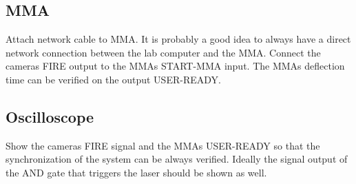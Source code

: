 \documentclass{scrartcl}
\begin{document}
\subsection{MMA}
Attach network cable to MMA. It is probably a good idea to always have
a direct network connection between the lab computer and the MMA.
Connect the cameras FIRE output to the MMAs START-MMA input. The MMAs
deflection time can be verified on the output USER-READY.

\subsection{Oscilloscope}
Show the cameras FIRE signal and the MMAs USER-READY so that the
synchronization of the system can be always verified. Ideally the
signal output of the AND gate that triggers the laser should be shown
as well.
\end{document}
